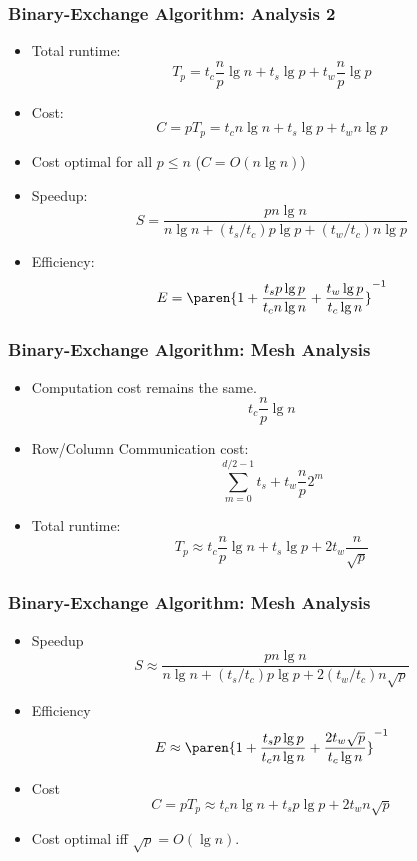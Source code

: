 \documentclass[xcolor=pdftex,dvipsnames,table]{presentation}
\begin{document}
\begin{frame}
	\frametitle{Binary-Exchange Algorithm: Analysis 2}

	\begin{itemize}
		\item Total runtime:
		\[
			T_p = t_c\frac{n}{p}\lg n + t_s\lg p+ t_w\frac{n}{p}\lg p
		\]
		\item Cost:
		\[
			C=pT_p=t_c n\lg n +t_s \lg p +t_w n\lg p
		\]
		\item Cost optimal for all $p\leq n$ ($C=O(n\lg n)$)
		\item Speedup:
		\[
			S=\frac{pn\lg n}{n\lg n+(t_s/t_c)p\lg p+(t_w/t_c)n\lg p}
		\]
		\item Efficiency:
		\[
			E=\paren{1+\frac{t_sp\lg p}{t_c n\lg n}+\frac{t_w\lg p}{t_c\lg n}}^{-1}
		\]
	\end{itemize}
\end{frame}

\begin{frame}
	\frametitle{Binary-Exchange Algorithm: Mesh Analysis}

	\begin{itemize}
		\item Computation cost remains the same.
		\[
			t_c\frac{n}{p}\lg n
		\]
		\item Row/Column Communication cost:
		\[
			\sum_{m=0}^{d/2-1} t_s+t_w\frac{n}{p}2^m
		\]
		\item Total runtime:
		\[
			T_p \approx t_c\frac{n}{p}\lg n+ t_s\lg p +2t_w\frac{n}{\sqrt{p}}
		\]
	\end{itemize}
\end{frame}

\begin{frame}
	\frametitle{Binary-Exchange Algorithm: Mesh Analysis}

	\begin{itemize}
		\item Speedup
		\[
			S\approx \frac{pn\lg n}{n\lg n+(t_s/t_c)p\lg p + 2(t_w/t_c)n\sqrt{p}}
		\]
		\item Efficiency
		\[
			E\approx \paren{1+\frac{t_s p\lg p}{t_c n\lg n}+\frac{2t_w\sqrt{p}}{t_c\lg n}}^{-1}
		\]
		\item Cost
		\[
			C=pT_p\approx t_c n\lg n+ t_s p\lg p +2t_w n\sqrt{p}
		\]
		\item Cost optimal iff $\sqrt{p}=O(\lg n)$.
	\end{itemize}
\end{frame}
\end{document}
